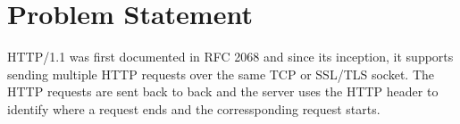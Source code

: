 \chapter{Problem Statement}
HTTP/1.1 was first documented in RFC 2068 \cite{b9} and since its inception, it supports sending multiple HTTP requests over the same TCP or SSL/TLS socket. The HTTP requests are sent back to back and the server uses the HTTP header to identify where a request ends and the corressponding request starts. 
